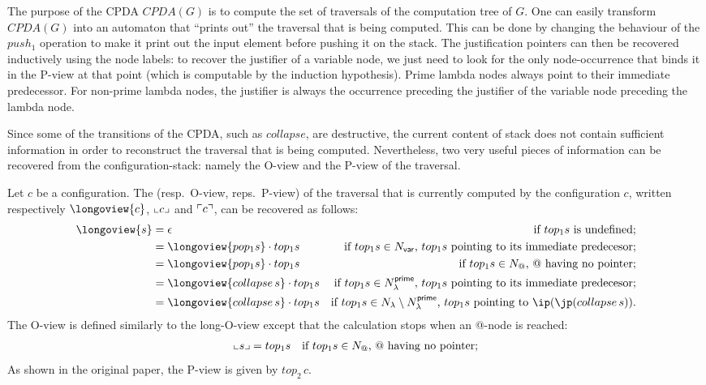 \documentclass{article}
\theoremstyle{remark}
\theoremstyle{definition}
\begin{document}
The purpose of the CPDA $CPDA(G)$ is to compute the set of traversals of the computation tree of $G$. One can easily transform $CPDA(G)$ into an automaton that ``prints out'' the traversal that is being computed. This can be done by changing the behaviour of the $push_1$ operation to make it print out the input element before pushing it on the stack. The justification pointers can then be recovered
inductively using the node labels: to recover the justifier of a variable node, we just need to look for the only node-occurrence that binds it in the P-view at that point (which is computable by the induction hypothesis).
Prime lambda nodes always point to their immediate predecessor. For non-prime lambda nodes, the justifier is always the occurrence preceding the justifier of the variable node preceding the lambda node.

Since some of the transitions of the CPDA, such as $collapse$, are destructive, the current content of stack does not contain sufficient information in order to reconstruct the traversal that is being computed.
Nevertheless, two very useful pieces of information can be recovered from the configuration-stack: namely the O-view and the P-view of the traversal.

Let $c$ be a configuration. The  
(resp.\ O-view, reps.\ P-view) of the traversal that is currently computed by the configuration $c$, written respectively $\longoview{c}$, $\llcorner c \lrcorner$ and $\ulcorner c \urcorner$, can be recovered as follows:
\begin{align*}
  \longoview{s} &= \epsilon & \mbox{if $top_1 s$ is undefined;} \\
      &=   \longoview{pop_1 s} \cdot top_1 s & \mbox{if $top_1 s \in N_{\sf var}$, $top_1 s$ pointing to its immediate predecesor;} \\
      &=   \longoview{pop_1 s} \cdot top_1 s & \mbox{if $top_1 s \in N_@$, $@$ having no pointer;} \\  
      &=   \longoview{collapse\,s} \cdot top_1 s & \mbox{if $top_1 s \in N_\lambda^{\sf prime}$, $top_1 s$ pointing to its immediate predecesor;} \\
      &=   \longoview{collapse\,s} \cdot top_1 s & \mbox{if $top_1 s \in N_\lambda\setminus N_\lambda^{\sf prime}$, $top_1 s$ pointing to $\ip(\jp(collapse\,s))$.} \\
\end{align*}
The O-view is defined similarly to the long-O-view except that the calculation stops when an @-node is reached:
\begin{align*}
  \llcorner s \lrcorner  &=   top_1 s & \mbox{if $top_1 s \in N_@$, $@$ having no pointer;} \\
\end{align*}
As shown in the original paper, the P-view is given by $top_2\,c$.
\end{document}
